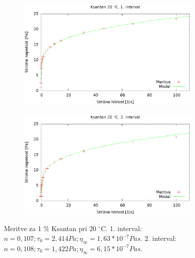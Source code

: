 \documentclass{article}
\begin{document}
\begin{figure}
	\centering
	\begin{subfigure}[b]{0.4\textwidth}
	       \includegraphics[width=\textwidth]{tok_ksan1.eps}
	   \end{subfigure}
	   \begin{subfigure}[b]{0.4\textwidth}
	       \includegraphics[width=\textwidth]{tok_ksan2.eps}
	   \end{subfigure}
	\caption{Meritve za 1 \% Ksantan pri 20 $^\circ$C. 1. interval: $n = 0,107; \tau_0 = 2,414 Pa; \eta_\infty = 1,63*10^{-7} Pa s$. 2. interval: $n = 0,108; \tau_0 = 1,422 Pa; \eta_\infty = 6,15*10^{-7} Pa s$.}
	\label{fig:tok_ksan1}
\end{figure}
\end{document}

